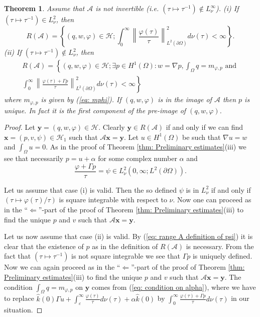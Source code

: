 \documentclass{amsart}
\newcommand{\norm}[1]{\left\| #1 \right\|}
\newcommand{\A}{\mathcal{A}}
\newcommand{\xnice}{\mathbf{x}}
\newcommand{\ynice}{\mathbf{y}}
\newcommand{\Ho}{\mathcal{H}}
\newcommand{\khat}{\hat{k}}
\newtheorem{Theorem}{Theorem}
\begin{document}
\begin{Theorem}\label{thm: range of A} Assume that $\A$ is not invertible (i.e. $(\tau\mapsto\tau^{-1})\notin L^{\infty}_{\nu}$).
 (i) If $(\tau\mapsto\tau^{-1})\in L^{2}_{\nu}$, then 
 \begin{equation}\nonumber
  R(\A) = \left\{ (q,w,\varphi)\in\Ho ; \int_0^{\infty} \norm{\frac{\varphi(\tau)}{\tau}}^2_{L^2(\partial\Omega)} d\nu(\tau) < \infty \right\} .
 \end{equation}
 (ii) If $(\tau\mapsto\tau^{-1})\notin L^{2}_{\nu}$, then 
 \begin{align*}
  R(\A) = \left\{ (q,w,\varphi)\in\Ho ; \exists p\in H^1(\Omega) :
           w=\nabla p, \int_{\Omega} q = m_{\varphi,p} \right. \text{ and }  \\
           \left. \int_0^{\infty} \norm{\frac{\varphi(\tau)+\Gamma p}{\tau}}^2_{L^2(\partial\Omega)} d\nu(\tau) < \infty \right\}
 \end{align*}
 where $m_{\varphi,p}$ is given by (\ref{eq: mphi}). If $(q,w,\varphi)$ is in the image of $\A$ then $p$ is unique. In fact it is the first component of the pre-image of $(q,w,\varphi)$.
\end{Theorem}

\begin{proof}
 Let $\ynice=(q,w,\varphi)\in\Ho$. Clearly $\ynice\in R(\A)$ if and only if we can find $\xnice=(p,v,\psi)\in\Ho_1$ such that $\A\xnice=\ynice$. Let $u\in H^1(\Omega)$ be such that $\nabla u = w$ and $\int_{\Omega} u = 0$. As in the proof of Theorem \ref{thm: Preliminary estimates}(iii) we see that necessarily $p=u+\alpha$ for some complex number $\alpha$ and 
 \begin{equation}\label{eq: range A definition of psi}
  \frac{\varphi + \Gamma p}{\tau} = \psi \in L_{\nu}^2(0,\infty; L^2(\partial\Omega)) .
 \end{equation}
 
 Let us assume that case (i) is valid. Then the so defined $\psi$ is in $L^2_{\nu}$ if and only if $(\tau\mapsto\varphi(\tau)/\tau)$ is square integrable with respect to $\nu$. Now one can proceed as in the ``$\Leftarrow$''-part of the proof of Theorem \ref{thm: Preliminary estimates}(iii) to find the unique $p$ and $v$ such that $\A \xnice = \ynice$.
 
 Let us now assume that case (ii) is valid. By (\ref{eq: range A definition of psi}) it is clear that the existence of $p$ as in the definition of $R(\A)$ is necessary. From the fact that $(\tau\mapsto\tau^{-1})$ is not square integrable we see that $\Gamma p$ is uniquely defined. Now we can again proceed as in the ``$\Leftarrow$''-part of the proof of Theorem \ref{thm: Preliminary estimates}(iii) to find the unique $p$ and $v$ such that $\A \xnice = \ynice$. The condition $\int_{\Omega} q = m_{\varphi,p}$ on $\ynice$ comes from (\ref{eq: condition on alpha}), where we have to replace $\khat(0) \Gamma u + \int_{\varepsilon}^{\infty} \frac{\varphi(\tau)}{\tau} d\nu(\tau) + \alpha\khat(0)$ by $\int_{0}^{\infty} \frac{\varphi(\tau)+\Gamma p}{\tau} d\nu(\tau)$ in our situation.
\end{proof}
\end{document}
